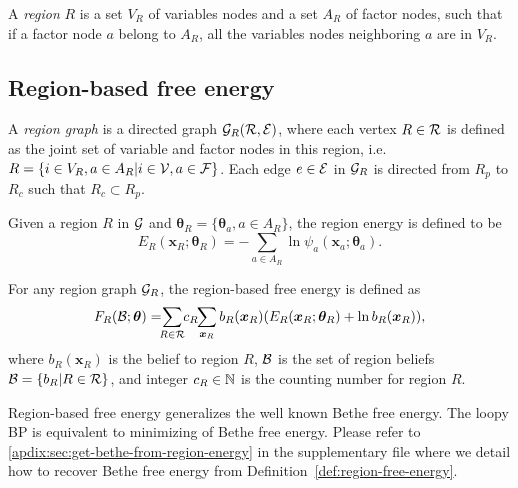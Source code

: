 \begin{definition}
  A \textit{region} $R$ is a set $V_R$ of variables nodes and a set $A_R$ of factor nodes, such that if a factor node $a$ belong to $A_R$, all the variables nodes neighboring $a$ are in $V_R$.
\end{definition}

\subsection{Region-based free energy}

\begin{definition}\label{def:region-graph}
  A \textit{region graph} is  a directed graph $\mathcal{G}_R(\mathcal{R}, \mathcal{E})$, where each vertex $R \in \mathcal{R}$ is defined as the joint set of variable and factor nodes in this region, i.e. $R = \left\{ i \in V_R, a \in A_R | i \in \mathcal{V}, a \in \mathcal{F} \right\}$. Each edge $e \in \mathcal{E}$ in $\mathcal{G}_R$ is directed from $R_p$ to $R_c$ such that $R_c \subset R_p$. 
\end{definition}

\begin{definition}
  Given a region $R$ in $\mathcal{G}$ and $\bm{\theta}_R=\{\bm{\theta}_a, a\in A_R\}$, the region energy is defined to be
  \begin{equation}
    E_R(\bm{x}_R; \bm{\theta}_R) = - \sum_{a\in A_R} \ln{\psi_a(\bm{x}_a; \bm{\theta}_a)}.
  \end{equation}
\end{definition}

\begin{definition}\label{def:region-free-energy}
  For any region graph $\mathcal{G}_R$, the region-based free energy is defined as
  \begin{equation}\label{eq:def-region-free-energy}
    F_R(\Bb; \bm{\theta}) = \hspace{-0.15cm}\sum_{R\in \Rr} \hspace{-0.1cm}c_R\hspace{-0.1cm} \sum_{\bm{x}_R}b_R(\bm{x}_R) (E_R(\bm{x}_R; \bm{\theta}_R) + \ln{b_R}(\bm{x}_R)),
  \end{equation}
  where $b_R(\bm{x}_R)$ is the belief to region $R$, $\mathcal{B}$ is the set of region beliefs $\mathcal{B} = \left\{ b_R| R \in \mathcal{R} \right\}$, and integer $c_R \in \mathbb{N}$ is the counting number for region $R$.
\end{definition}

{Region-based free energy generalizes the well known Bethe free energy. The loopy BP is equivalent to minimizing of Bethe free energy. Please refer to \ref{apdix:sec:get-bethe-from-region-energy} in the supplementary file where we detail how to recover Bethe free energy from Definition~\ref{def:region-free-energy}}.


